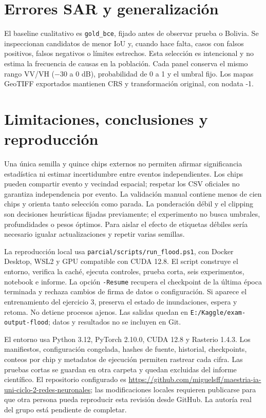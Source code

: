 \section{Errores SAR y generalización}

El baseline cualitativo es \texttt{gold\_bce}, fijado antes de observar prueba o Bolivia.
Se inspeccionan candidatos de menor IoU y, cuando hace falta, casos con falsos positivos,
falsos negativos o límites estrechos. Esta selección es intencional y no estima la
frecuencia de causas en la población. Cada panel conserva el mismo rango VV/VH
($-30$ a 0 dB), probabilidad de 0 a 1 y el umbral fijo. Los mapas GeoTIFF exportados
mantienen CRS y transformación original, con nodata -1.

\section{Limitaciones, conclusiones y reproducción}

Una única semilla y quince chips externos no permiten afirmar significancia estadística
ni estimar incertidumbre entre eventos independientes. Los chips pueden compartir evento
y vecindad espacial; respetar los CSV oficiales no garantiza independencia por evento.
La validación manual contiene menos de cien chips y orienta tanto selección como parada.
La ponderación débil y el clipping son decisiones heurísticas fijadas previamente;
el experimento no busca umbrales, profundidades o pesos óptimos. Para aislar el efecto
de etiquetas débiles sería necesario igualar actualizaciones y repetir varias semillas.

La reproducción local usa \texttt{parcial/scripts/run\_flood.ps1}, con Docker Desktop,
WSL2 y GPU compatible con CUDA 12.8. El script construye el entorno, verifica la caché,
ejecuta controles, prueba corta, seis experimentos, notebook e informe. La opción
\texttt{-Resume} recupera el checkpoint de la última época terminada y rechaza cambios
de firma de datos o configuración. Si aparece el entrenamiento del ejercicio 3, preserva
el estado de inundaciones, espera y retoma. No detiene procesos ajenos. Las salidas quedan
en \texttt{E:/Kaggle/exam-output-flood}; datos y resultados no se incluyen en Git.

El entorno usa Python 3.12, PyTorch 2.10.0, CUDA 12.8 y Rasterio 1.4.3.
Los manifiestos, configuración congelada, hashes de fuente, historial, checkpoints,
conteos por chip y metadatos de ejecución permiten rastrear cada cifra. Las pruebas cortas
se guardan en otra carpeta y quedan excluidas del informe científico. El repositorio
configurado es \url{https://github.com/miguelsff/maestria-ia-uni-ciclo-2-redes-neuronales};
las modificaciones locales requieren publicarse para que otra persona pueda reproducir
esta revisión desde GitHub. La autoría real del grupo está pendiente de completar.




